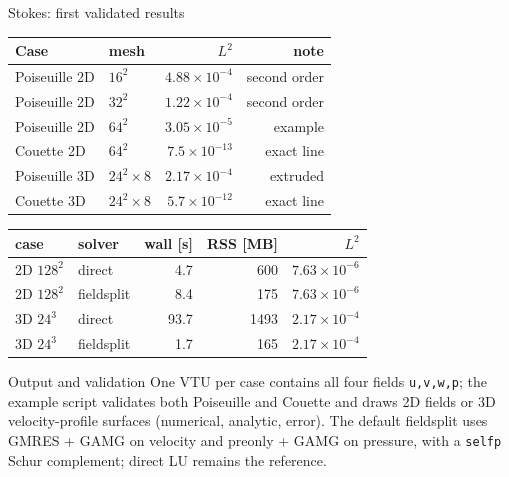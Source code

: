 \documentclass[aspectratio=169,10pt]{beamer}
\begin{document}
\begin{frame}{Stokes: first validated results}
  \begin{center}
    \small
    \begin{tabular}{llrr}
      \toprule
      Case & mesh & $L^2$ & note \\
      \midrule
      Poiseuille 2D & $16^2$ & $4.88\times10^{-4}$ & second order \\
      Poiseuille 2D & $32^2$ & $1.22\times10^{-4}$ & second order \\
      Poiseuille 2D & $64^2$ & $3.05\times10^{-5}$ & example \\
      Couette 2D & $64^2$ & $7.5\times10^{-13}$ & exact line \\
      Poiseuille 3D & $24^2\times8$ & $2.17\times10^{-4}$ & extruded \\
      Couette 3D & $24^2\times8$ & $5.7\times10^{-12}$ & exact line \\
      \bottomrule
    \end{tabular}
  \end{center}

  \begin{center}
    \small
    \begin{tabular}{llrrr}
      \toprule
      case & solver & wall [s] & RSS [MB] & $L^2$ \\
      \midrule
      2D $128^2$ & direct & 4.7 & 600 & $7.63\times10^{-6}$ \\
      2D $128^2$ & fieldsplit & 8.4 & 175 & $7.63\times10^{-6}$ \\
      3D $24^3$ & direct & 93.7 & 1493 & $2.17\times10^{-4}$ \\
      3D $24^3$ & fieldsplit & 1.7 & 165 & $2.17\times10^{-4}$ \\
      \bottomrule
    \end{tabular}
  \end{center}

  \begin{block}{Output and validation}
    One VTU per case contains all four fields \texttt{u,v,w,p}; the example
    script validates both Poiseuille and Couette and draws 2D fields or 3D
    velocity-profile surfaces (numerical, analytic, error). The default
    fieldsplit uses GMRES + GAMG on velocity and preonly + GAMG on pressure,
    with a \texttt{selfp} Schur complement; direct LU remains the reference.
  \end{block}
\end{frame}
\end{document}

